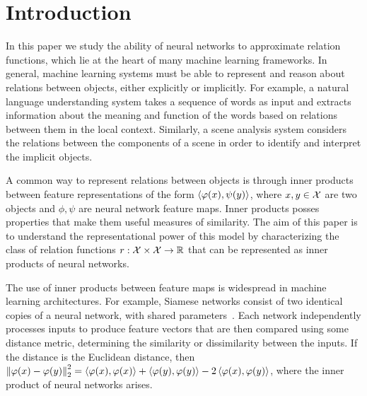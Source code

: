 \section{Introduction}\label{sec:intro}


In this paper we study the ability of neural networks to approximate relation functions, which 
lie at the heart of many machine learning frameworks. In general, 
machine learning systems must be able to represent and reason about relations between objects, either explicitly or implicitly. For example, a natural language understanding system takes a sequence of words as input and extracts information about the meaning and function of the words based on relations between them in the local context. Similarly, a scene analysis system considers the relations between the components of a scene in order to identify and interpret the implicit objects.

A common way to represent relations between objects is through inner products between feature representations of the form $\left \langle \varphi(x), \psi(y) \right\rangle$, where $x, y \in {\mathcal{X}}$ are two objects and $\phi, \psi$ are neural network feature maps. Inner products posses properties that make them useful measures of similarity. The aim of this paper is to understand the representational power of this model by characterizing the class of relation functions $r: {\mathcal{X}} \times {\mathcal{X}} \to \mathbb{R}$ that can be represented as inner products of neural networks.

The use of inner products between feature maps is widespread in machine learning architectures. 
For example, Siamese networks consist of two identical copies of a neural network, with shared parameters~\parencite{rumelhartLearningRepresentationsBackpropagating1986,langTimedelayNeuralNetwork1988,bromleySignatureVerificationUsing1993,baldiNeuralNetworksFingerprint1993,chopraLearningSimilarityMetric2005,kochSiameseNeuralNetworks2015}. Each network independently processes inputs to produce feature vectors that are then compared using some distance metric, determining the similarity or dissimilarity between the inputs. If the distance is the Euclidean distance, then $\left\lVert\varphi(x) - \varphi(y)\right\rVert_{2}^2 = \left \langle \varphi(x), \varphi(x) \right\rangle + \left \langle \varphi(y), \varphi(y) \right\rangle - 2 \left \langle \varphi(x), \varphi(y) \right\rangle$, where the inner product of neural networks arises.

